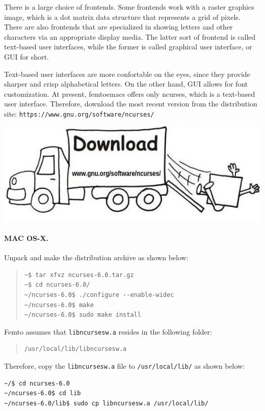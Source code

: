 \documentclass[a4paper,12pt]{book}
\begin{document}
There is a large choice of frontends. Some frontends 
work with a raster graphics image, which  is a dot matrix 
data structure that represents a grid of pixels. 
There are also frontends that are specialized in
showing letters and other characters via an appropriate
display media. The latter sort of frontend is called
text-based user interfaces, while the former is called
graphical user interface, or GUI for short.

Text-based user interfaces are more
confortable on the eyes, since they  provide
sharper and crisp alphabetical letters.
On the other hand, GUI allows for font 
customization. At present,
femtoemacs offers only ncurses, which
is a text-based user interface.
Therefore, download the most recent version 
from the distribution site:
\verb|https://www.gnu.org/software/ncurses/|

\includegraphics[scale=0.6]{figs-prefix/download.jpg}


\paragraph{MAC OS-X.}
Unpack and make the distribution archive as shown below:
\begin{quote}
\begin{verbatim}
~$ tar xfvz ncurses-6.0.tar.gz
~$ cd ncurses-6.0/
~/ncurses-6.0$ ./configure --enable-widec
~/ncurses-6.0$ make
~/ncurses-6.0$ sudo make install
\end{verbatim}
\end{quote}
Femto assumes that  \verb|libncursesw.a|
resides in the following folder:
\begin{quote}
\begin{verbatim}
/usr/local/lib/libncursesw.a 
\end{verbatim}
\end{quote}
Therefore, copy the \verb|libncursesw.a| file
to \verb|/usr/local/lib/| as shown below:
\begin{verbatim}
~/$ cd ncurses-6.0 
~/ncurses-6.0$ cd lib 
~/ncurses-6.0/lib$ sudo cp libncursesw.a /usr/local/lib/
\end{verbatim}
\end{document}
